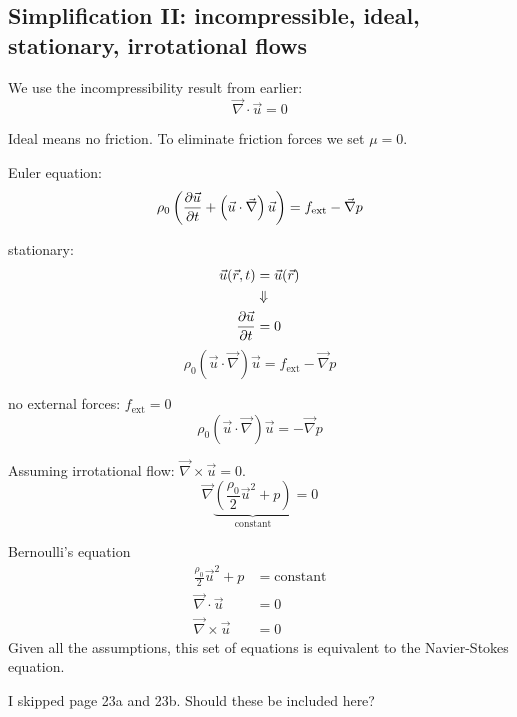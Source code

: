 \subsection{Simplification II: incompressible, ideal, stationary, irrotational flows}
We use the incompressibility result from earlier:
\begin{equation}
\vec{\nabla}\cdot\vec{u} = 0
\end{equation}

Ideal means no friction. To eliminate friction forces we set $\mu=0$.

Euler equation:
\begin{equation}
\rho_0\left(\frac{\partial \vec{u}}{\partial t}+\left(\vec{u}\cdot\vec{\nabla}\right)\vec{u}\right) = f_\mathrm{ext}-\vec{\nabla}p
\end{equation}

stationary:
\begin{align}
\vec{u}(\vec{r},t) &= \vec{u}(\vec{r})\\
&\Downarrow\notag\\
\frac{\partial \vec{u}}{\partial t} &= 0
\end{align}
\begin{equation}
\rho_0\left(\vec{u}\cdot\vec{\nabla}\right)\vec{u} = f_\mathrm{ext}-\vec{\nabla}p
\end{equation}

no external forces: $f_\mathrm{ext}=0$
\begin{equation}
\rho_0\left(\vec{u}\cdot\vec{\nabla}\right)\vec{u} = -\vec{\nabla}p
\end{equation}

Assuming irrotational flow: $\vec{\nabla}\times\vec{u}=0$.
\begin{equation}
\vec{\nabla}\underbrace{\left(\frac{\rho_0}{2}\vec{u}^2+p\right)}_\mathrm{constant}=0
\end{equation}

Bernoulli's equation
\begin{align}
\frac{\rho_0}{2}\vec{u}^2+p &= \mathrm{constant}\\
\vec{\nabla}\cdot\vec{u} &= 0\\
\vec{\nabla}\times\vec{u} &= 0
\end{align}
Given all the assumptions, this set of equations is equivalent to the Navier-Stokes equation.

\begin{shaded}
I skipped page 23a and 23b. Should these be included here?
\end{shaded}


